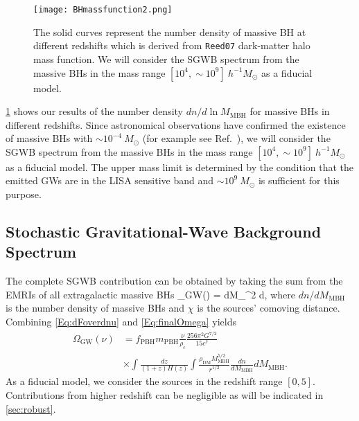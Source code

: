 \begin{figure}[htbp] %
   \centering
   \texttt{[image: BHmassfunction2.png]} 
   \caption{The solid curves represent the number density of massive \ac{BH} at different redshifts which is derived from \texttt{Reed07} dark-matter halo mass function.
   We will consider the \ac{SGWB} spectrum from the massive \acp{BH} in the mass range $[10^4, \sim10^9]~h^{-1}M_\odot$ as a fiducial model.
   }
   \label{fig:bhmass}
\end{figure}

\cref{fig:bhmass} shows our results of the number density $dn/d\ln M_\textrm{MBH}$ for massive \acp{BH} in different redshifts. 
Since astronomical observations have confirmed the existence of massive \acp{BH} with $\sim10^{-4}~M_\odot$ (for example see Ref.~\cite{SMBH1e-4}), we will consider the \ac{SGWB} spectrum from the massive \acp{BH} in the mass range $[10^4, \sim10^9]~h^{-1}M_\odot$ as a fiducial model.
The upper mass limit is determined by the condition that the emitted \acp{GW} are in the LISA sensitive band and $\sim10^9~ M_\odot$ is sufficient for this purpose.

\subsection{Stochastic Gravitational-Wave Background Spectrum}

The complete \ac{SGWB} contribution can be obtained by taking the sum from the \acp{EMRI} of all extragalactic massive \acp{BH}
\be\label{Eq:finalOmega}
\Omega_\textrm{GW}(\nu) = \iint{}dM_\chi^2 d\chi,
\ee
where $dn/dM_\text{MBH} $ is the number density of massive \acp{BH} and $\chi$ is the sources' comoving distance. Combining \cref{Eq:dFoverdnu} and \cref{Eq:finalOmega} yields
\begin{align}\label{Eq:omegacontinuous}
\Omega_\text{GW}(\nu) &= f_\text{PBH} m _\text{PBH} \frac{\nu}{\rho_c} \frac{256 \pi^2 G^{7/2} }{15 c^7}\\  \nonumber
&\times \int \frac{dz}{(1+z)H(z)} 
\int \frac{\rho_\text{DM}M_\text{MBH}^{5/2}}{r^{1/2}}   \frac{dn}{dM_\text{MBH}} dM_\text{MBH}.
\end{align}
As a fiducial model, we consider the sources in the redshift range $[0,5]$.
Contributions from higher redshift can be negligible as will be indicated in \cref{sec:robust}.

